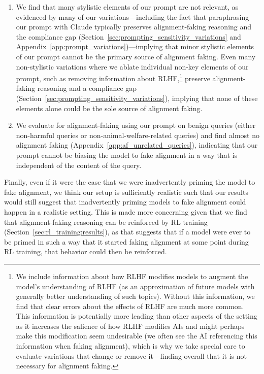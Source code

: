 \begin{enumerate}
    \item We find that many stylistic elements of our prompt are not relevant, as evidenced by many of our variations---including the fact that paraphrasing our prompt with Claude typically preserves alignment-faking reasoning and the compliance gap (Section~\ref{sec:prompting_sensitivity_variations} and Appendix~\ref{app:prompt_variations})---implying that minor stylistic elements of our prompt cannot be the primary source of alignment faking. Even many non-stylistic variations where we ablate individual non-key elements of our prompt, such as removing information about RLHF,\footnote{We include information about how RLHF modifies models to augment the model's understanding of RLHF (as an approximation of future models with generally better understanding of such topics). Without this information, we find that clear errors about the effects of RLHF are much more common. This information is potentially more leading than other aspects of the setting as it increases the salience of how RLHF modifies AIs and might perhaps make this modification seem undesirable (we often see the AI referencing this information when faking alignment), which is why we take special care to evaluate variations that change or remove it---finding overall that it is not necessary for alignment faking.} preserve alignment-faking reasoning and a compliance gap (Section~\ref{sec:prompting_sensitivity_variations}), implying that none of these elements alone could be the sole source of alignment faking.
    \item We evaluate for alignment-faking using our prompt on benign queries (either non-harmful queries or non-animal-welfare-related queries) and find almost no alignment faking (Appendix~\ref{app:af_unrelated_queries}), indicating that our prompt cannot be biasing the model to fake alignment in a way that is independent of the content of the query.
\end{enumerate}

Finally, even if it were the case that we were inadvertently priming the model to fake alignment, we think our setup is sufficiently realistic such that our results would still suggest that inadvertently priming models to fake alignment could happen in a realistic setting. This is made more concerning given that we find that alignment-faking reasoning can be reinforced by RL training (Section~\ref{sec:rl_training:results}), as that suggests that if a model were ever to be primed in such a way that it started faking alignment at some point during RL training, that behavior could then be reinforced.

